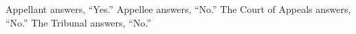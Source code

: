 \documentclass[12pt,\documentclassflag]{michiganCourtOfAppealsBrief}
\begin{document}
  Appellant answers, ``Yes.'' Appellee answers, ``No.'' The Court of Appeals answers, ``No.'' The Tribunal answers, ``No.'' 











\end{document}
